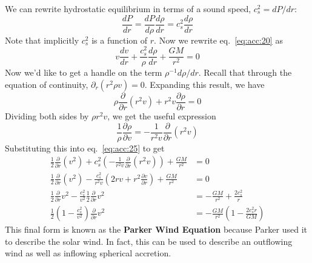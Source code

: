 \documentclass[10pt]{article}
\numberwithin{equation}{section}
\newcommand{\n}{\noindent}
\begin{document}
		\n We can rewrite hydrostatic equilibrium in terms of a sound speed, $c_s^2 = dP/dr$:
		\begin{equation}
			\label{eq:acc:24} \frac{dP}{dr} = \frac{dP}{d\rho}\frac{d\rho}{dr} = c_s^2\frac{d\rho}{dr}
		\end{equation}
		Note that implicitly $c_s^2$ is a function of $r$. Now we rewrite eq.~\eqref{eq:acc:20} as
		\begin{equation}
			\label{eq:acc:25} v\frac{dv}{dr} + \frac{c_s^2}{\rho}\frac{d\rho}{dr} + \frac{GM}{r^2} = 0
		\end{equation}
		Now we'd like to get a handle on the term $\rho^{-1}d\rho/dr$. Recall that through the equation of continuity, $\partial_r(r^2\rho v)=0$. Expanding this result, we have
		\begin{equation}
			\label{eq:acc:26} \rho\frac{\partial}{\partial r}(r^2v) + r^2 v\frac{\partial\rho}{\partial r} = 0
		\end{equation}
		Dividing both sides by $\rho r^2 v$, we get the useful expression
		\begin{equation}
			\label{eq:acc:27} \frac{1}{\rho}\frac{\partial\rho}{\partial v} = -\frac{1}{r^2v}\frac{\partial}{\partial r}(r^2v)
		\end{equation}
		Substituting this into eq.~\eqref{eq:acc:25} to get
		\begin{align}
			\label{eq:acc:28} \frac{1}{2}\frac{\partial}{\partial r}(v^2) + c_s^2\left( -\frac{1}{r^2v} \frac{\partial}{\partial r} (r^2v)\right) + \frac{GM}{r^2} &= 0\\
			\label{eq:acc:29} \frac{1}{2}\frac{\partial}{\partial r}(v^2) - \frac{c_s^2}{r^2v}\left( 2rv + r^2 \frac{\partial v}{\partial r} \right) + \frac{GM}{r^2} &= 0\\
			\label{eq:acc:30} \frac{1}{2}\frac{\partial}{\partial r} v^2 - \frac{c_s^2}{v^2}\frac{1}{2} \frac{\partial}{\partial r} v^2 &= -\frac{GM}{r^2} + \frac{2c_s^2}{r}\\
			\label{eq:acc:31} \frac{1}{2} \left(1-\frac{c_s^2}{v^2}\right) \frac{\partial}{\partial r}v^2 &= -\frac{GM}{r^2} \left(1 - \frac{2c_s^2 r}{GM}\right)
		\end{align}
		This final form is known as the \textbf{Parker Wind Equation} because Parker used it to describe the solar wind. In fact, this can be used to describe an outflowing wind as well as inflowing spherical accretion. \\
		
\end{document}
